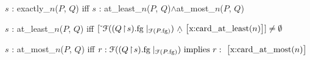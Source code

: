 \begin{ex}
  \begin{subex} 
 
  \item $s$ : exactly\_$n$($P$, $Q$) iff $s$ : at\_least\_$n$($P$, $Q$)$\wedge$at\_most\_$n$($P$, $Q$)
 
\item $s$ : at\_least\_$n$($P$, $Q$) iff
          $\down{\mathcal{F}((Q\!\restriction\!        s).\text{fg}\mid_{\mathcal{F}(P.\text{fg})})
        \text{ \d{$\wedge$} \smallrecord{\smalltfield{x}{card\_at\_least($n$)}}}}
      \not=\emptyset$

      
    \item $s$ : at\_most\_$n$($P$, $Q$) iff
          $r:\mathcal{F}((Q\!\restriction\!        s).\text{fg}\mid_{\mathcal{F}(P.\text{fg})})
        \text{ implies } r:\text{ \smallrecord{\smalltfield{x}{card\_at\_most($n$)}}}$
      
 
\end{subex} 
  
\label{ex:cardconstr} 
\end{ex}


